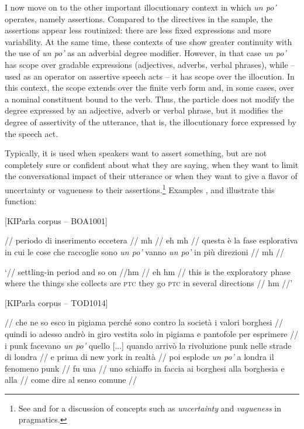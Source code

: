I now move on to the other important illocutionary context in which \textit{un po’} operates, namely assertions. Compared to the directives in the sample, the assertions appear less routinized: there are less fixed expressions and more variability. At the same time, these contexts of use show greater continuity with the use of \textit{un po’} as an adverbial degree modifier. However, in that case \textit{un po’} has scope over gradable expressions (adjectives, adverbs, verbal phrases), while – used as an operator on assertive speech acts – it has scope over the illocution. In this context, the scope extends over the finite verb form and, in some cases, over a nominal constituent bound to the verb. Thus, the particle does not modify the degree expressed by an adjective, adverb or verbal phrase, but it modifies the degree of assertivity of the utterance, that is, the illocutionary force expressed by the speech act.

Typically, it is used when speakers want to assert something, but are not completely sure or confident about what they are saying, when they want to limit the conversational impact of their utterance or when they want to give a flavor of uncertainty or vagueness to their assertions.\footnote{See \citet{Franken1997} and \citet{AllwoodEtAl2014} for a discussion of concepts such as \textit{uncertainty} and \textit{vagueness} in pragmatics.} Examples ,  and  illustrate this function:

\ea%
    \label{ex:key:77}

          [KIParla corpus – BOA1001]

// periodo di inserimento eccetera // mh // eh mh // questa è la fase esplorativa in cui le cose che raccoglie sono \textit{un po’} vanno \textit{un po’} in più direzioni // mh //

\glt ‘// settling-in period and so on //hm // eh hm // this is the exploratory phase where the things she collects are \textsc{ptc} they go \textsc{ptc} in several directions // hm //’
    \z %

\largerpage
\ea%
    \label{ex:key:78}

          [KIParla corpus – TOD1014]

// che ne so esco in pigiama perché sono contro la società i valori borghesi // quindi io adesso andrò in giro vestita solo in pigiama e pantofole per esprimere // i punk facevano \textit{un po’} quello [...] quando arrivò la rivoluzione punk nelle strade di londra // e prima di new york in realtà // poi esplode \textit{un po’} a londra il fenomeno punk // fu una // uno schiaffo in faccia ai borghesi alla borghesia e alla // come dire al senso comune //

